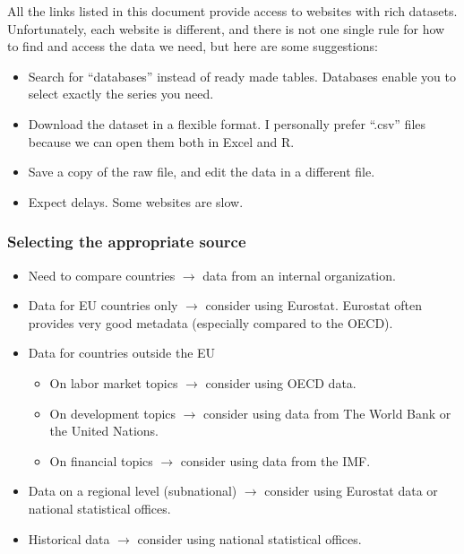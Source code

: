 \documentclass[
]{book}
\providecommand{\tightlist}{%
  \setlength{\itemsep}{0pt}\setlength{\parskip}{0pt}}
\begin{document}
All the links listed in this document provide access to websites with rich datasets. Unfortunately, each website is different, and there is not one single rule for how to find and access the data we need, but here are some suggestions:

\begin{itemize}
\tightlist
\item
  Search for ``databases'' instead of ready made tables. Databases enable you to select exactly the series you need.
\item
  Download the dataset in a flexible format. I personally prefer ``.csv'' files because we can open them both in Excel and R.
\item
  Save a copy of the raw file, and edit the data in a different file.
\item
  Expect delays. Some websites are slow.
\end{itemize}

\hypertarget{selecting-the-appropriate-source}{%
\subsubsection*{Selecting the appropriate source}\label{selecting-the-appropriate-source}}

\begin{itemize}
\item
  Need to compare countries \(\rightarrow\) data from an internal organization.
\item
  Data for EU countries only \(\rightarrow\) consider using Eurostat. Eurostat often provides very good metadata (especially compared to the OECD).
\item
  Data for countries outside the EU

  \begin{itemize}
  \tightlist
  \item
    On labor market topics \(\rightarrow\) consider using OECD data.
  \item
    On development topics \(\rightarrow\) consider using data from The World Bank or the United Nations.
  \item
    On financial topics \(\rightarrow\) consider using data from the IMF.
  \end{itemize}
\item
  Data on a regional level (subnational) \(\rightarrow\) consider using Eurostat data or national statistical offices.
\item
  Historical data \(\rightarrow\) consider using national statistical offices.
\end{itemize}
\end{document}
